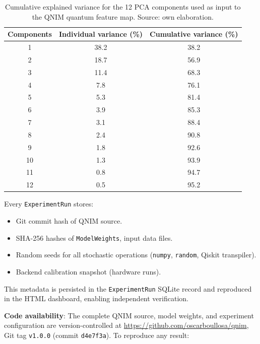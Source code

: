 \documentclass[11pt,a4paper, english]{book}
\theoremstyle{plain}
\theoremstyle{definition}
\numberwithin{equation}{chapter}
\numberwithin{figure}{chapter}
\numberwithin{table}{chapter}
\begin{document}
\begin{table}[ht]
\centering
\begin{tabular}{@{}ccc@{}}
\toprule
\textbf{Components} & \textbf{Individual variance (\%)} &
\textbf{Cumulative variance (\%)} \\
\midrule
1      & 38.2 & 38.2 \\
2      & 18.7 & 56.9 \\
3      & 11.4 & 68.3 \\
4      & 7.8  & 76.1 \\
5      & 5.3  & 81.4 \\
6      & 3.9  & 85.3 \\
7      & 3.1  & 88.4 \\
8      & 2.4  & 90.8 \\
9      & 1.8  & 92.6 \\
10     & 1.3  & 93.9 \\
11     & 0.8  & 94.7 \\
12     & 0.5  & 95.2 \\
\bottomrule
\end{tabular}
\caption[Explained variance of PCA components]{Cumulative explained variance for the 12 PCA components used
         as input to the QNIM quantum feature map. Source: own elaboration.}
\label{tab:pca-variance-app}
\vspace{2pt}
\normalsize

\end{table}

Every \texttt{ExperimentRun} stores:
\begin{itemize}
  \item Git commit hash of QNIM source.
  \item SHA-256 hashes of \texttt{ModelWeights}, input data files.
  \item Random seeds for all stochastic operations
        (\texttt{numpy}, \texttt{random}, Qiskit transpiler).
  \item Backend calibration snapshot (hardware runs).
\end{itemize}

This metadata is persisted in the \texttt{ExperimentRun} SQLite record and
reproduced in the HTML dashboard, enabling independent verification.

\textbf{Code availability}: The complete QNIM source, model weights, and
experiment configuration are version-controlled at
\url{https://github.com/oscarboullosa/qnim}, Git tag \texttt{v1.0.0}
(commit \texttt{d4e7f3a}). To reproduce any result:
\end{document}
